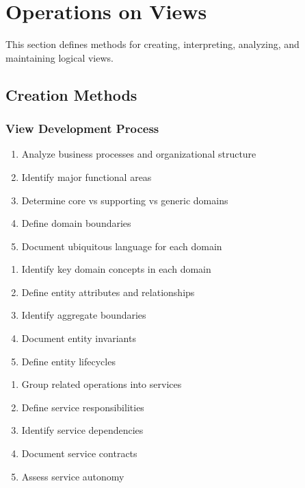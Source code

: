 \documentclass[11pt,letterpaper]{article}
\begin{document}
\section{Operations on Views}

This section defines methods for creating, interpreting, analyzing, and maintaining logical views.

\subsection{Creation Methods}

\subsubsection{View Development Process}

\begin{guidancebox}
\begin{enumerate}[nosep]
    \item Analyze business processes and organizational structure
    \item Identify major functional areas
    \item Determine core vs supporting vs generic domains
    \item Define domain boundaries
    \item Document ubiquitous language for each domain
\end{enumerate}
\end{guidancebox}

\begin{guidancebox}
\begin{enumerate}[nosep]
    \item Identify key domain concepts in each domain
    \item Define entity attributes and relationships
    \item Identify aggregate boundaries
    \item Document entity invariants
    \item Define entity lifecycles
\end{enumerate}
\end{guidancebox}

\begin{guidancebox}
\begin{enumerate}[nosep]
    \item Group related operations into services
    \item Define service responsibilities
    \item Identify service dependencies
    \item Document service contracts
    \item Assess service autonomy
\end{enumerate}
\end{guidancebox}
\end{document}
